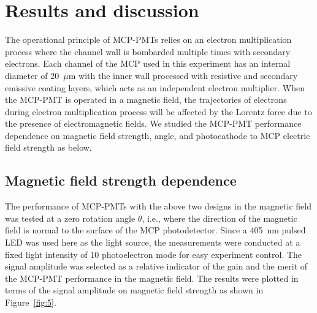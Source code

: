 \documentclass[preprint,5p]{elsarticle}
\begin{document}
\section{Results and discussion} \label{}
The operational principle of MCP-PMTs relies on an electron multiplication process 
where the channel wall is bombarded multiple times with secondary electrons. Each 
channel of the MCP used in this experiment has an internal diameter of 
20~$\mu$m with the inner wall processed with resistive and secondary emissive 
coating layers, which acts as an independent electron multiplier. When the MCP-PMT is 
operated in a magnetic field, the trajectories of electrons during electron 
multiplication process will be affected by the Lorentz force due to the 
presence of electromagnetic fields. We studied the MCP-PMT performance 
dependence on magnetic field strength, angle, and photocathode to MCP electric 
field strength as below. 

\subsection{Magnetic field strength dependence} \label{}
The performance of MCP-PMTs with the above two designs in the magnetic field 
was tested at a zero rotation angle $\theta$, i.e., where the direction of the 
magnetic field is normal to the surface of the MCP photodetector. Since a 
405~nm pulsed LED was used here as the light source, the measurements were 
conducted at a fixed light intensity of 10 photoelectron mode for easy 
experiment control.  The signal amplitude was selected as a relative indicator 
of the gain and the merit of the MCP-PMT performance in the magnetic field.  
The results were plotted in terms of the signal amplitude on magnetic field 
strength as shown in Figure~\ref{fig:5}. 
\end{document}
